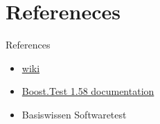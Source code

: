 \documentclass{beamer}
\begin{document}
    \section{Refereneces}
    \begin{frame}{References}
        \begin{itemize}
            \item \href{https://en.wikipedia.org/wiki/Software_testing}{wiki}
            \item \href{https://www.boost.org/doc/libs/1_58_0/libs/test/}{Boost.Test 1.58 documentation}
            \item Basiswissen Softwaretest
        \end{itemize}
    \end{frame}
\end{document}
